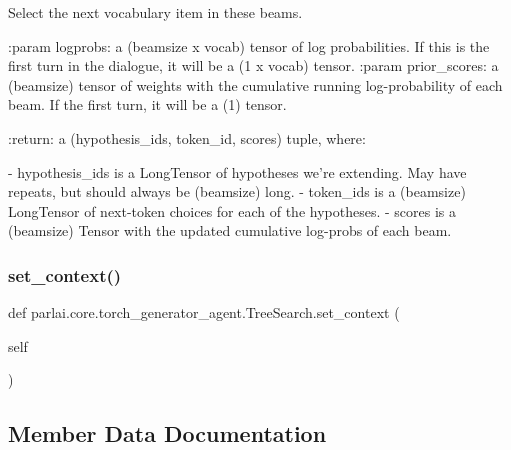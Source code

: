 \begin{DoxyVerb}Select the next vocabulary item in these beams.

:param logprobs:
    a (beamsize x vocab) tensor of log probabilities. If this is the first
    turn in the dialogue, it will be a (1 x vocab) tensor.
:param prior_scores:
    a (beamsize) tensor of weights with the cumulative running
    log-probability of each beam. If the first turn, it will be a (1) tensor.

:return:
    a (hypothesis_ids, token_id, scores) tuple, where:

    - hypothesis_ids is a LongTensor of hypotheses we're extending. May have
      repeats, but should always be (beamsize) long.
    - token_ids is a (beamsize) LongTensor of next-token choices for
      each of the hypotheses.
    - scores is a (beamsize) Tensor with the updated cumulative log-probs
      of each beam.
\end{DoxyVerb}
 \mbox{\label{classparlai_1_1core_1_1torch__generator__agent_1_1TreeSearch_a4706cbec7117a8a2696774c044fc0729}} 
\subsubsection{\texorpdfstring{set\+\_\+context()}{set\_context()}}
{\footnotesize\ttfamily def parlai.\+core.\+torch\+\_\+generator\+\_\+agent.\+Tree\+Search.\+set\+\_\+context (\begin{DoxyParamCaption}\item[{}]{self }\end{DoxyParamCaption})}



\subsection{Member Data Documentation}
\mbox{\label{classparlai_1_1core_1_1torch__generator__agent_1_1TreeSearch_ac9e79a3effa48d2e35ac879620cd639e}} 
